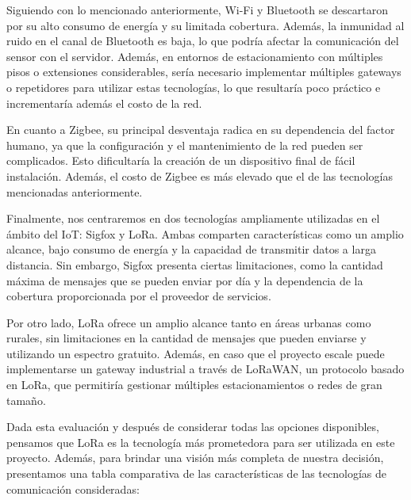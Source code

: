 Siguiendo con lo mencionado anteriormente, Wi-Fi y Bluetooth se descartaron por su alto consumo de energía y su limitada cobertura. Además, la inmunidad al ruido en el canal de Bluetooth es baja, lo que podría afectar la comunicación del sensor con el servidor. Además, en entornos de estacionamiento con múltiples pisos o extensiones considerables, sería necesario implementar múltiples gateways o repetidores para utilizar estas tecnologías, lo que resultaría poco práctico e incrementaría además el costo de la red.

En cuanto a Zigbee, su principal desventaja radica en su dependencia del factor humano, ya que la configuración y el mantenimiento de la red pueden ser complicados. Esto dificultaría la creación de un dispositivo final de fácil instalación. Además, el costo de Zigbee es más elevado que el de las tecnologías mencionadas anteriormente.

Finalmente, nos centraremos en dos tecnologías ampliamente utilizadas en el ámbito del IoT: Sigfox y LoRa. Ambas comparten características como un amplio alcance, bajo consumo de energía y la capacidad de transmitir datos a larga distancia. Sin embargo, Sigfox presenta ciertas limitaciones, como la cantidad máxima de mensajes que se pueden enviar por día y la dependencia de la cobertura proporcionada por el proveedor de servicios.

Por otro lado, LoRa ofrece un amplio alcance tanto en áreas urbanas como rurales, sin limitaciones en la cantidad de mensajes que pueden enviarse y utilizando un espectro gratuito. Además, en caso que el proyecto escale puede implementarse un gateway industrial a través de LoRaWAN, un protocolo basado en LoRa, que permitiría gestionar múltiples estacionamientos o redes de gran tamaño.

Dada esta evaluación y después de considerar todas las opciones disponibles, pensamos que LoRa es la tecnología más prometedora para ser utilizada en este proyecto. Además, para brindar una visión más completa de nuestra decisión, presentamos una tabla comparativa de las características de las tecnologías de comunicación consideradas:

